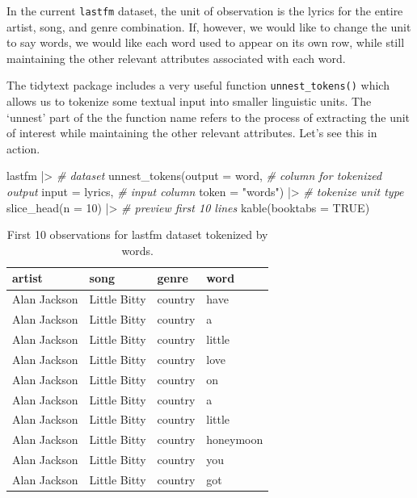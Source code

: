 \documentclass[
  letterpaper,
]{scrbook}
\newenvironment{Shaded}{\begin{snugshade}}{\end{snugshade}}
\newcommand{\AttributeTok}[1]{\textcolor[rgb]{0.00,0.00,0.00}{#1}}
\newcommand{\CommentTok}[1]{\textcolor[rgb]{0.00,0.00,0.00}{\textit{#1}}}
\newcommand{\ConstantTok}[1]{\textcolor[rgb]{0.00,0.00,0.00}{#1}}
\newcommand{\DecValTok}[1]{\textcolor[rgb]{0.00,0.00,0.00}{#1}}
\newcommand{\FunctionTok}[1]{\textcolor[rgb]{0.00,0.00,0.00}{#1}}
\newcommand{\NormalTok}[1]{\textcolor[rgb]{0.00,0.00,0.00}{#1}}
\newcommand{\SpecialCharTok}[1]{\textcolor[rgb]{0.00,0.00,0.00}{#1}}
\newcommand{\StringTok}[1]{\textcolor[rgb]{0.00,0.00,0.00}{#1}}
\begin{document}
In the current \texttt{lastfm} dataset, the unit of observation is the
lyrics for the entire artist, song, and genre combination. If, however,
we would like to change the unit to say words, we would like each word
used to appear on its own row, while still maintaining the other
relevant attributes associated with each word.

The tidytext package includes a very useful function
\texttt{unnest\_tokens()} which allows us to tokenize some textual input
into smaller linguistic units. The `unnest' part of the the function
name refers to the process of extracting the unit of interest while
maintaining the other relevant attributes. Let's see this in action.

\begin{Shaded}
\begin{Highlighting}[]
\NormalTok{lastfm }\SpecialCharTok{|\textgreater{}} \CommentTok{\# dataset}
  \FunctionTok{unnest\_tokens}\NormalTok{(}\AttributeTok{output =}\NormalTok{ word, }\CommentTok{\# column for tokenized output}
                \AttributeTok{input =}\NormalTok{ lyrics, }\CommentTok{\# input column}
                \AttributeTok{token =} \StringTok{"words"}\NormalTok{) }\SpecialCharTok{|\textgreater{}} \CommentTok{\# tokenize unit type}
  \FunctionTok{slice\_head}\NormalTok{(}\AttributeTok{n =} \DecValTok{10}\NormalTok{) }\SpecialCharTok{|\textgreater{}}  \CommentTok{\# preview first 10 lines}
  \FunctionTok{kable}\NormalTok{(}\AttributeTok{booktabs =} \ConstantTok{TRUE}\NormalTok{)}
\end{Highlighting}
\end{Shaded}

\hypertarget{tbl-td-lastfm-tokenize-words}{}
\begin{table}
\caption{\label{tbl-td-lastfm-tokenize-words}First 10 observations for lastfm dataset tokenized by words. }\tabularnewline

\centering
\begin{tabular}{llll}
\toprule
artist & song & genre & word\\
\midrule
Alan Jackson & Little Bitty & country & have\\
Alan Jackson & Little Bitty & country & a\\
Alan Jackson & Little Bitty & country & little\\
Alan Jackson & Little Bitty & country & love\\
Alan Jackson & Little Bitty & country & on\\
\addlinespace
Alan Jackson & Little Bitty & country & a\\
Alan Jackson & Little Bitty & country & little\\
Alan Jackson & Little Bitty & country & honeymoon\\
Alan Jackson & Little Bitty & country & you\\
Alan Jackson & Little Bitty & country & got\\
\bottomrule
\end{tabular}
\end{table}
\end{document}
